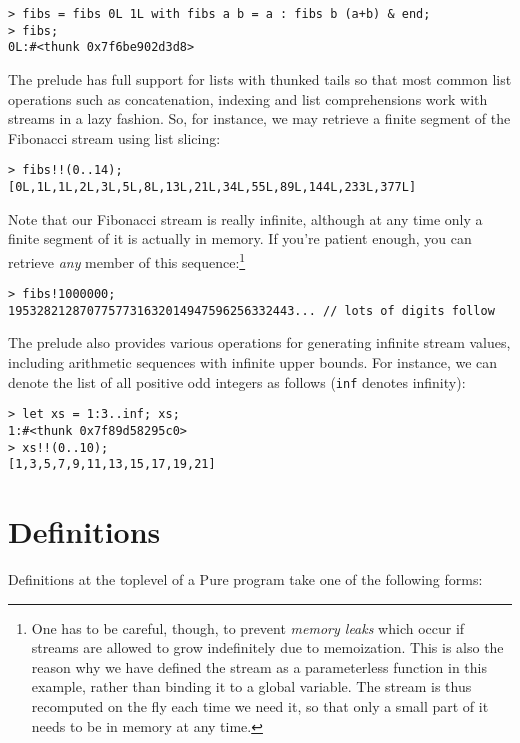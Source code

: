 \documentclass[a4paper,12pt]{article}
\begin{document}
\begin{lstlisting}
> fibs = fibs 0L 1L with fibs a b = a : fibs b (a+b) & end;
> fibs;
0L:#<thunk 0x7f6be902d3d8>
\end{lstlisting}

The prelude has full support for lists with thunked tails so that most common list operations such as concatenation, indexing and list comprehensions work with streams in a lazy fashion. So, for instance, we may retrieve a finite segment of the Fibonacci stream using list slicing:

\begin{lstlisting}
> fibs!!(0..14);
[0L,1L,1L,2L,3L,5L,8L,13L,21L,34L,55L,89L,144L,233L,377L]
\end{lstlisting}

Note that our Fibonacci stream is really infinite, although at any time only a finite segment of it is actually in memory. If you're patient enough, you can retrieve \emph{any} member of this sequence:\footnote{One has to be careful, though, to prevent \emph{memory leaks} which occur if streams are allowed to grow indefinitely due to memoization. This is also the reason why we have defined the stream as a parameterless function in this example, rather than binding it to a global variable. The stream is thus recomputed on the fly each time we need it, so that only a small part of it needs to be in memory at any time.}

\begin{lstlisting}
> fibs!1000000;
1953282128707757731632014947596256332443... // lots of digits follow
\end{lstlisting}

The prelude also provides various operations for generating infinite stream values, including arithmetic sequences with infinite upper bounds. For instance, we can denote the list of all positive odd integers as follows (\verb|inf| denotes infinity):

\begin{lstlisting}
> let xs = 1:3..inf; xs;
1:#<thunk 0x7f89d58295c0>
> xs!!(0..10);
[1,3,5,7,9,11,13,15,17,19,21]
\end{lstlisting}

\section{Definitions}
\label{Definitions}

Definitions at the toplevel of a Pure program take one of the following forms:
\end{document}
